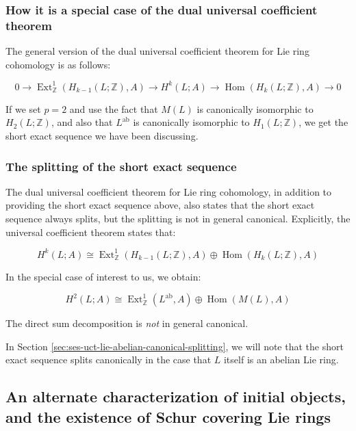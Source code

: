 \subsubsection{How it is a special case of the dual universal coefficient theorem}

The general version of the dual universal coefficient theorem for
Lie ring cohomology is as follows:

$$0 \to \operatorname{Ext}^1_{\mathbb{Z}}(H_{k-1}(L;\mathbb{Z}),A) \to H^k(L;A) \to \operatorname{Hom}(H_k(L;\mathbb{Z}),A) \to 0$$

If we set $p = 2$ and use the fact that $M(L)$ is canonically
isomorphic to $H_2(L;\mathbb{Z})$, and also that
$L^{\operatorname{ab}}$ is canonically isomorphic to
$H_1(L;\mathbb{Z})$, we get the short exact sequence we have been
discussing.

\subsubsection{The splitting of the short exact sequence}

The dual universal coefficient theorem for Lie ring cohomology, in addition
to providing the short exact sequence above, also states that the
short exact sequence always splits, but the splitting is not in
general canonical. Explicitly, the universal coefficient theorem
states that:

$$H^k(L;A) \cong \operatorname{Ext}^1_{\mathbb{Z}}(H_{k-1}(L;\mathbb{Z}),A) \oplus \operatorname{Hom}(H_k(L;\mathbb{Z}),A)$$

In the special case of interest to us, we obtain:

$$H^2(L;A) \cong \operatorname{Ext}^1_{\mathbb{Z}}(L^{\operatorname{ab}},A) \oplus \operatorname{Hom}(M(L),A)$$

The direct sum decomposition is {\em not} in general canonical. %

In Section \ref{sec:ses-uct-lie-abelian-canonical-splitting}, we will note that the
short exact sequence splits canonically in the case that $L$ itself is
an abelian Lie ring.

\subsection{An alternate characterization of initial objects, and the existence of Schur covering Lie rings}

